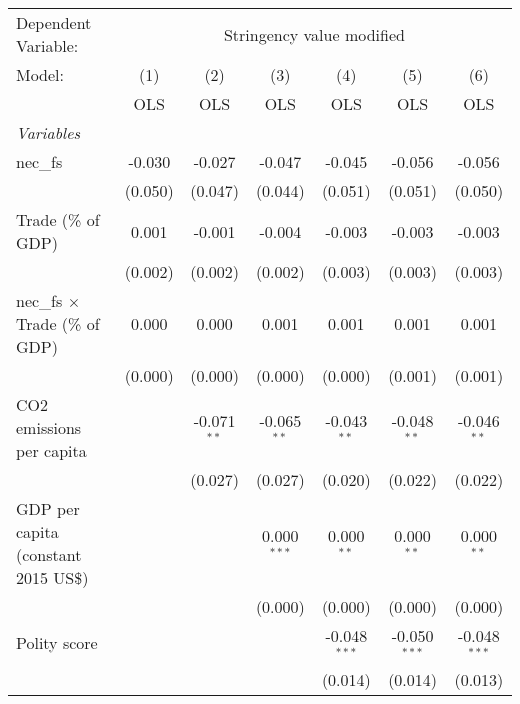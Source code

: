 
\begingroup
\centering
\begin{tabular}{lcccccc}
   \toprule
   Dependent Variable: & \multicolumn{6}{c}{Stringency value modified}\\
   Model:                                & (1)     & (2)           & (3)           & (4)            & (5)            & (6)\\  
                                         &  OLS    & OLS           & OLS           & OLS            & OLS            & OLS\\  
   \midrule
   \emph{Variables}\\
   nec\_fs                               & -0.030  & -0.027        & -0.047        & -0.045         & -0.056         & -0.056\\   
                                         & (0.050) & (0.047)       & (0.044)       & (0.051)        & (0.051)        & (0.050)\\   
   Trade (\% of GDP)                     & 0.001   & -0.001        & -0.004        & -0.003         & -0.003         & -0.003\\   
                                         & (0.002) & (0.002)       & (0.002)       & (0.003)        & (0.003)        & (0.003)\\   
   nec\_fs $\times$ Trade (\% of GDP)    & 0.000   & 0.000         & 0.001         & 0.001          & 0.001          & 0.001\\   
                                         & (0.000) & (0.000)       & (0.000)       & (0.000)        & (0.001)        & (0.001)\\   
   CO2 emissions per capita              &         & -0.071$^{**}$ & -0.065$^{**}$ & -0.043$^{**}$  & -0.048$^{**}$  & -0.046$^{**}$\\   
                                         &         & (0.027)       & (0.027)       & (0.020)        & (0.022)        & (0.022)\\   
   GDP per capita (constant 2015 US\$)   &         &               & 0.000$^{***}$ & 0.000$^{**}$   & 0.000$^{**}$   & 0.000$^{**}$\\   
                                         &         &               & (0.000)       & (0.000)        & (0.000)        & (0.000)\\   
   Polity score                          &         &               &               & -0.048$^{***}$ & -0.050$^{***}$ & -0.048$^{***}$\\   
                                         &         &               &               & (0.014)        & (0.014)        & (0.013)\\   

\end{tabular}
